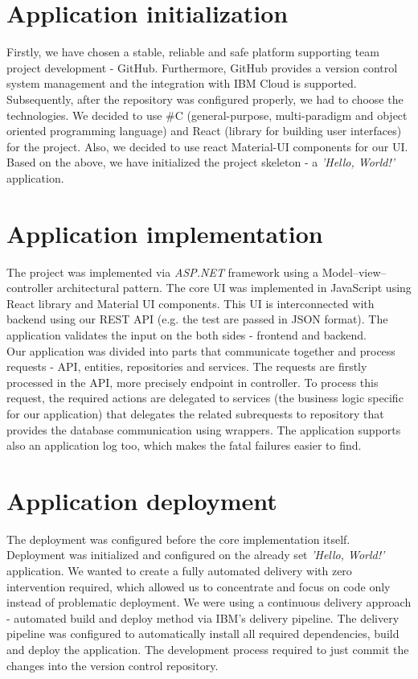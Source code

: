 \documentclass[11pt,a4paper]{article}
\begin{document}
\section{Application initialization}

Firstly, we have chosen a stable, reliable and safe platform supporting team project development - GitHub. Furthermore, GitHub provides a version control system management and the integration with IBM Cloud is supported. Subsequently, after the repository was configured properly, we had to choose the technologies. We decided to use \#C (general-purpose, multi-paradigm and object oriented programming language) and React (library for building user interfaces) for the project. Also, we decided to use react Material-UI components for our UI. Based on the above, we have initialized the project skeleton - a \textit{'Hello, World!'} application.

\section{Application implementation}

The project was implemented via \textit{ASP.NET} framework using a Model--view--controller architectural pattern. The core UI was implemented in JavaScript using React library and Material UI components. This UI is interconnected with backend using our REST API (e.g. the test are passed in JSON format). The application validates the input on the both sides - frontend and backend.\\

Our application was divided into parts that communicate together and process requests - API, entities, repositories and services. The requests are firstly processed in the API, more precisely endpoint in controller. To process this request, the required actions are delegated to services (the business logic specific for our application) that delegates the related subrequests to repository that provides the database communication using wrappers. The application supports also an application log too, which makes the fatal failures easier to find.

\section{Application deployment}

The deployment was configured before the core implementation itself. Deployment was initialized and configured on the already set \textit{'Hello, World!'} application. We wanted to create a fully automated delivery with zero intervention required, which allowed us to concentrate and focus on code only instead of problematic deployment. We were using a continuous delivery approach - automated build and deploy method via IBM's delivery pipeline. The delivery pipeline was configured to automatically install all required dependencies, build and deploy the application. The development process required to just commit the changes into the version control repository.\\
\end{document}
